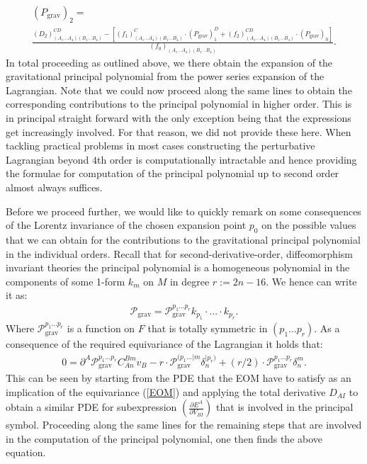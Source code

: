 \begin{multline}\label{POLY3}
    (P_{\text{grav}})_2 = \\
    \frac{(D_2)^{CD}_{(A_1...A_4)(B_1...B_4)}-\left [ (f_1)^C_{(A_1...A_4)(B_1...B_4)} \cdot (P_{\text{grav}})^D_1  +(f_2)^{CD}_{(A_1...A_4)(B_1...B_4)} \cdot (P_{\text{grav}})_0 \right ]}{(f_0)_{(A_1...A_4)(B_1...B_4)}}.
\end{multline}
In total proceeding as outlined above, we there obtain the expansion of the gravitational principal polynomial from the power series expansion of the Lagrangian.
Note that we could now proceed along the same lines to obtain the corresponding contributions to the principal polynomial in higher order. This is in principal straight forward with the only exception being that the expressions get increasingly involved. For that reason, we did not provide these here. When tackling practical problems in most cases constructing the perturbative Lagrangian beyond $4$th order is computationally intractable and hence providing the formulae for computation of the principal polynomial up to second order almost always suffices.

Before we proceed further, we would like to quickly remark on some consequences of the Lorentz invariance of the chosen expansion point $p_0$ on the possible values that we can obtain for the contributions to the gravitational principal polynomial in the individual orders. Recall that for second-derivative-order, diffeomorphism invariant theories the principal polynomial is a homogeneous polynomial in the components of some 1-form $k_m$ on $M$ in degree $r := 2n-16$. We hence can write it as:
\begin{align}
    \mathcal{P}_{\text{grav}} = \mathcal{P}_{\text{grav}}^{{p_1}...{p_{r}}} k_{p_1} \cdot ... \cdot k_{p_r}.
\end{align}
Where $\mathcal{P}_{\text{grav}}^{{p_1}...{p_r}}$ is a function on $F$ that is totally symmetric in $(p_1...p_r)$. As a consequence of the required equivariance of the Lagrangian it holds that:
\begin{align}\label{polyEqn}
    0 = \partial^A\mathcal{P}_{\text{grav}}^{{p_1}...{p_r}}C_{An}^{Bm}v_B - r \cdot \mathcal{P}_{\text{grav}}^{({p_1}...\vert m} \delta_{n}^{\vert p_r) }  + (r/2) \cdot \mathcal{P}_{\text{grav}}^{{p_1}...{p_r}} \delta^m_n.
\end{align}
%
%
%
This can be seen by starting from the PDE that the EOM have to satisfy as an implication of the equivariance (\ref{EOM}) and applying the total derivative $D_{AI}$ to obtain a similar PDE for subexpression $\left ( \frac{\partial E^A}{\partial V_{BI}} \right )$ that is involved in the principal symbol. Proceeding along the same lines for the remaining steps that are involved in the computation of the principal polynomial, one then finds the above equation. 

